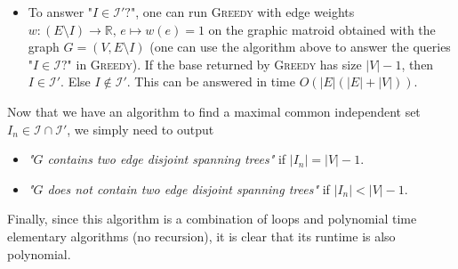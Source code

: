 \documentclass[10pt]{article}
\newenvironment{exercise}[2][Exercise]{\begin{trivlist}
  \item[\hskip \labelsep {\bfseries #1}\hskip \labelsep {\bfseries #2.}]}{\end{trivlist}}
\begin{document}
\begin{exercise}{2b}
\begin{enumerate}
\begin{itemize}
\item To answer "$I \in \mathcal{I}'?$", one can run \textsc{Greedy}  with edge weights $w : (E \setminus I) \to \mathbb{R}, \, e \mapsto w(e) = 1$ on the graphic matroid obtained with the graph $G=(V, E\setminus I)$ (one can use the algorithm above to answer the queries "$I \in \mathcal{I}?$" in \textsc{Greedy}). If the base returned by \textsc{Greedy} has size $|V|-1$, then $I \in \mathcal{I}'$. Else $I \not \in \mathcal{I}'$. This can be answered in time $O(|E|(|E|+|V|))$.
\end{itemize}
\end{enumerate}
Now that we have an algorithm to find a maximal common independent set $I_n \in \mathcal{I} \cap \mathcal{I}'$, we simply need to output 
\begin{itemize}
\item \emph{"$G$ contains two edge disjoint spanning trees"} if $|I_n| = |V|-1$.
\item \emph{"$G$ does not contain two edge disjoint spanning trees"} if $|I_n| < |V|-1$.
\end{itemize}
Finally, since this algorithm is a combination of loops and polynomial time elementary algorithms (no recursion), it is clear that its runtime is also polynomial.
  \end{exercise}
\end{document}

